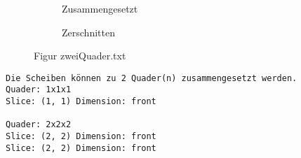 \documentclass[a4paper,10pt,ngerman]{scrartcl}
\newcommand{\simplecube}[8]%
{
    \begin{scope}[shift={#1}]
        \fill[gray!40,canvas is yz plane at x=#2, opacity=#8] (0,0) rectangle (#3,#4);
        \fill[gray!10,canvas is xz plane at y=#3, opacity=#8] (0,0) rectangle (#2,#4);
        \fill[white  ,canvas is xy plane at z=#4, opacity=#8] (0,0) rectangle (#2,#3);
        \foreach\i/\j in {0/1, 1/1, 1/0}
            {
            \draw[line#5] (0,#3*\i,#4*\j) --++ (#2,0,0);
            \draw[line#6] (#2*\i,0,#4*\j) --++ (0,#3,0);
            \draw[line#7] (#2*\i,#3*\j,0) --++ (0,0,#4);
        }
    \end{scope}
}
\newcommand{\unsolvedSquare}[4]%
{
    \begin{scope}[shift={#1}]
        \simplecube{(0,     0,      0)}     {1}{2}{2}   {a}{a}{a}   {1}
        \simplecube{(1+#4,   0,      0))}    {1}{2}{2}   {a}{a}{a}   {1}
        \simplecube{(2+2*#4,   0,      0))}    {1}{1}{1}   {a}{a}{a}   {1}
    \end{scope}
}
\begin{document}
    \begin{figure}[H]
        \centering
        \def\a{3.2}
        \def\b{1.2}
        \begin{subfigure}[b]{0.45\textwidth}
            \centering %
            \caption{Zusammengesetzt}\label{fig:figA3}
        \end{subfigure}
        \begin{subfigure}[b]{0.45\textwidth}
            \centering %
            \caption{Zerschnitten}\label{fig:figB3}
        \end{subfigure}
        \caption{Figur zweiQuader.txt}\label{fig:figAB3}
    \end{figure}

    \begin{lstlisting}[frame=single, title=Programmausgabe zweiQuader.txt, breaklines=true,label={lst:lstlisting2}]
    Die Scheiben können zu 2 Quader(n) zusammengesetzt werden.
Quader: 1x1x1
Slice: (1, 1) Dimension: front

Quader: 2x2x2
Slice: (2, 2) Dimension: front
Slice: (2, 2) Dimension: front
    \end{lstlisting}
\end{document}
